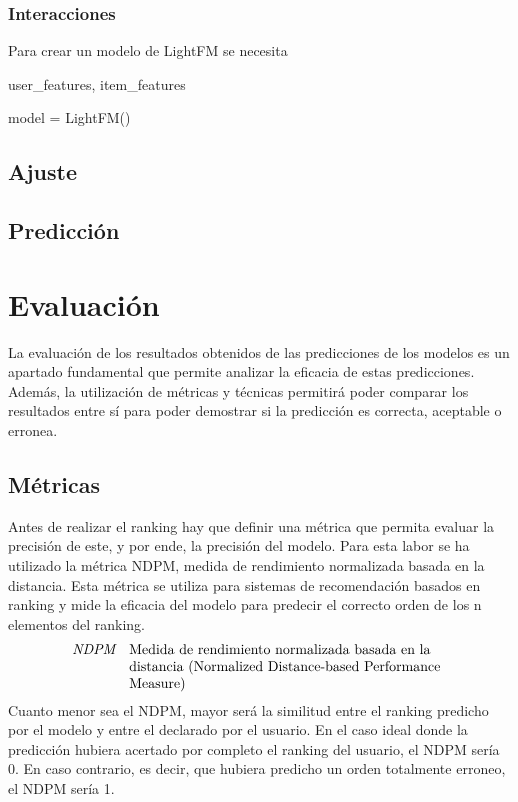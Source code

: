 \subsubsection{Interacciones}


Para crear un modelo de LightFM se necesita

user\_features, item\_features 

model = LightFM() 


\subsection{Ajuste}
\subsection{Predicción}


\section{Evaluación}
La evaluación de los resultados obtenidos de las predicciones de los modelos es un apartado fundamental que permite analizar la eficacia de estas predicciones. Además, la utilización de métricas y técnicas permitirá poder comparar los resultados entre sí para poder demostrar si la predicción es correcta, aceptable o erronea.
\subsection{Métricas}

Antes de realizar el ranking hay que definir una métrica que permita evaluar la precisión de este, y por ende, la precisión del modelo. Para esta labor se ha utilizado la métrica NDPM, medida de rendimiento normalizada basada en la distancia. Esta métrica se utiliza para sistemas de recomendación basados en ranking y mide la eficacia del modelo para predecir el correcto orden de los n elementos del ranking. 
%
\begin{align*}
    \textit{NDPM} && \parbox[t]{8cm}{\raggedright Medida de rendimiento normalizada basada en la distancia (Normalized Distance-based Performance Measure)} \nonumber 
\end{align*}
%
Cuanto menor sea el NDPM, mayor será la similitud entre el ranking predicho por el modelo y entre el declarado por el usuario. En el caso ideal donde la predicción hubiera acertado por completo el ranking del usuario, el NDPM sería 0. En caso contrario, es decir, que hubiera predicho un orden totalmente erroneo, el NDPM sería 1.

